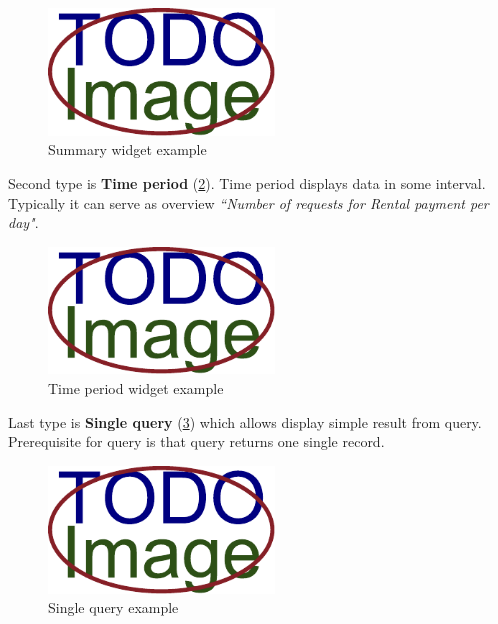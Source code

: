 \documentclass[thesis=B,english]{FITthesis}[2012/06/26]
\begin{document}
      \begin{figure}[ht!]
          \centering
          \includegraphics[width=6cm,keepaspectratio]{img/TODO-image}
          \caption{Summary widget example}
          \label{fig:widget-summary}
      \end{figure}   
    
   	Second type is \textbf{Time period} (\cref{fig:widget-time-period}). Time period displays data in some interval. Typically it can serve as overview \textit{``Number of requests for Rental payment per day"}.        
      
      \begin{figure}[ht!]
          \centering
          \includegraphics[width=6cm,keepaspectratio]{img/TODO-image}
          \caption{Time period widget example}
          \label{fig:widget-time-period}
      \end{figure}
    
    Last type is \textbf{Single query} (\cref{fig:widget-single-query}) which allows display simple result from query. Prerequisite for query is that query returns one single record. 
      
      \begin{figure}[ht!]
          \centering
          \includegraphics[width=6cm,keepaspectratio]{img/TODO-image}
          \caption{Single query example}
           \label{fig:widget-single-query}
      \end{figure}       
    
\end{document}
